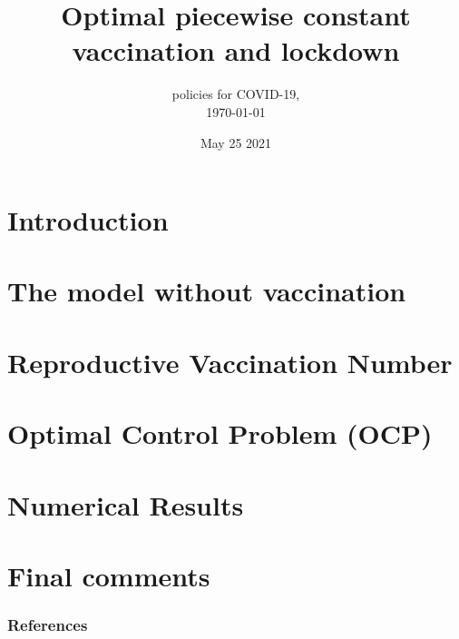 \documentclass[9pt]{beamer}
\title{\LARGE{Optimal piecewise constant vaccination and lockdown }}
\subtitle{%
    policies for COVID-19, \\
    \today 
}
\date{May 25 2021}
\begin{document}
    \titlepage
    \section*{Introduction}
        
    \section{The model without vaccination}
        
        
    \section{Reproductive Vaccination Number}
         
     \section{Optimal Control Problem (OCP)}
         
     \section{Numerical Results}
         
     \section{Final comments}
         
     \begin{frame}[allowframebreaks]
         \frametitle{References}
         
         
     \end{frame}
\end{document}

